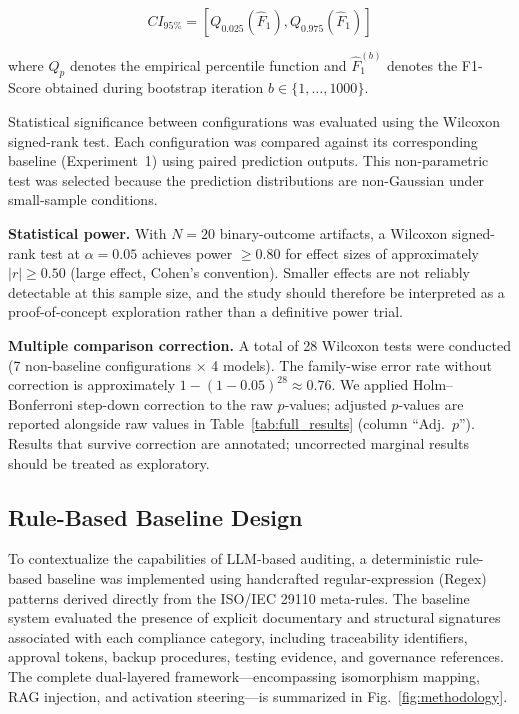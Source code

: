 \documentclass{ieeeaccess}
\begin{document}
\begin{equation}
CI_{95\%} = \left[
Q_{0.025}(\hat{F}_1),
Q_{0.975}(\hat{F}_1)
\right]
\label{eq:bootstrap_ci}
\end{equation}

where $Q_p$ denotes the empirical percentile function and $\hat{F}_1^{(b)}$ denotes the F1-Score obtained during bootstrap iteration $b \in \{1,\dots,1000\}$.

Statistical significance between configurations was evaluated using the Wilcoxon signed-rank test. Each configuration was compared against its corresponding baseline (Experiment~1) using paired prediction outputs. This non-parametric test was selected because the prediction distributions are non-Gaussian under small-sample conditions.

\textbf{Statistical power.} With $N=20$ binary-outcome artifacts, a Wilcoxon signed-rank test at $\alpha=0.05$ achieves power $\geq 0.80$ for effect sizes of approximately $|r| \geq 0.50$ (large effect, Cohen's convention). Smaller effects are not reliably detectable at this sample size, and the study should therefore be interpreted as a proof-of-concept exploration rather than a definitive power trial.

\textbf{Multiple comparison correction.} A total of 28 Wilcoxon tests were conducted (7 non-baseline configurations $\times$ 4 models). The family-wise error rate without correction is approximately $1-(1-0.05)^{28} \approx 0.76$. We applied Holm--Bonferroni step-down correction to the raw $p$-values; adjusted $p$-values are reported alongside raw values in Table~\ref{tab:full_results} (column ``Adj.\ $p$''). Results that survive correction are annotated; uncorrected marginal results should be treated as exploratory.

\subsection{Rule-Based Baseline Design}
\label{sec:baseline}

To contextualize the capabilities of LLM-based auditing, a deterministic rule-based baseline was implemented using handcrafted regular-expression (Regex) patterns derived directly from the ISO/IEC 29110 meta-rules. The baseline system evaluated the presence of explicit documentary and structural signatures associated with each compliance category, including traceability identifiers, approval tokens, backup procedures, testing evidence, and governance references. The complete dual-layered framework---encompassing isomorphism mapping, RAG injection, and activation steering---is summarized in Fig.~\ref{fig:methodology}.
\end{document}
